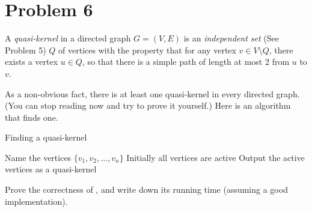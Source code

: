 \section*{Problem 6}
A \emph{quasi-kernel} in a directed graph $G = (V, E)$ is an \emph{independent set} (See Problem 5) $Q$ of vertices with the property that for any vertex $v \in V \setminus Q$, there exists a vertex $u \in Q$, so that there is a simple path of length at most $2$ from $u$ to $v$.

As a non-obvious fact, there is at least one quasi-kernel in every directed graph. (You can stop reading now and try to prove it yourself.) Here is an algorithm that finds one.

\begin{algorithm}
\caption{Finding a quasi-kernel}
\label{alg:qk}
Name the vertices $\{v_1, v_2, \ldots, v_n\}$\;
Initially all vertices are active\;
Output the active vertices as a quasi-kernel\;
\end{algorithm}

Prove the correctness of , and write down its running time (assuming a good implementation).

